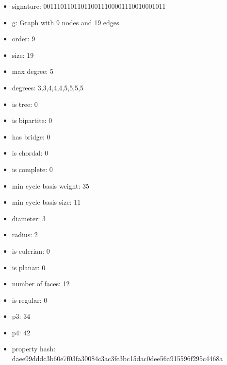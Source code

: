 \newpage
\begin{figure}
\end{figure}
\begin{itemize}
\item signature: 001110110110110011100001110010001011
\item g: Graph with 9 nodes and 19 edges
\item order: 9
\item size: 19
\item max degree: 5
\item degrees: 3,3,4,4,4,5,5,5,5
\item is tree: 0
\item is bipartite: 0
\item has bridge: 0
\item is chordal: 0
\item is complete: 0
\item min cycle basis weight: 35
\item min cycle basis size: 11
\item diameter: 3
\item radius: 2
\item is eulerian: 0
\item is planar: 0
\item number of faces: 12
\item is regular: 0
\item p3: 34
\item p4: 42
\item property hash: daee99dddc3b60e7f03fa30084c3ac3fc3bc15dac0dee56a915596f295c4468a
\end{itemize}
